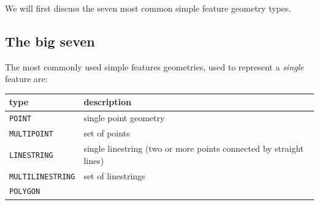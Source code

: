\documentclass[]{book}
\begin{document}
We will first discuss the seven most common simple feature geometry
types.

\hypertarget{seven}{%
\subsection{The big seven}\label{seven}}

The most commonly used simple features geometries, used to represent a \emph{single} feature are:

\begin{longtable}[]{@{}ll@{}}
\toprule
\begin{minipage}[b]{0.25\columnwidth}\raggedright
type\strut
\end{minipage} & \begin{minipage}[b]{0.69\columnwidth}\raggedright
description\strut
\end{minipage}\tabularnewline
\midrule
\endhead
\begin{minipage}[t]{0.25\columnwidth}\raggedright
\texttt{POINT}\strut
\end{minipage} & \begin{minipage}[t]{0.69\columnwidth}\raggedright
single point geometry\strut
\end{minipage}\tabularnewline
\begin{minipage}[t]{0.25\columnwidth}\raggedright
\texttt{MULTIPOINT}\strut
\end{minipage} & \begin{minipage}[t]{0.69\columnwidth}\raggedright
set of points\strut
\end{minipage}\tabularnewline
\begin{minipage}[t]{0.25\columnwidth}\raggedright
\texttt{LINESTRING}\strut
\end{minipage} & \begin{minipage}[t]{0.69\columnwidth}\raggedright
single linestring (two or more points connected by straight lines)\strut
\end{minipage}\tabularnewline
\begin{minipage}[t]{0.25\columnwidth}\raggedright
\texttt{MULTILINESTRING}\strut
\end{minipage} & \begin{minipage}[t]{0.69\columnwidth}\raggedright
set of linestrings\strut
\end{minipage}\tabularnewline
\begin{minipage}[t]{0.25\columnwidth}\raggedright
\texttt{POLYGON}\strut
\end{minipage} & \begin{minipage}[t]{0.69\columnwidth}\raggedright

\end{minipage}
\end{longtable}
\end{document}
